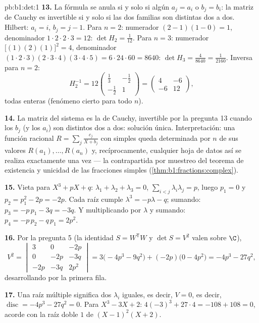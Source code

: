 \begin{solution}{pb:b1:det:1}
\textbf{13.} La fórmula se anula si y solo si algún $a_j = a_i$ o
$b_j = b_i$: la matriz de Cauchy es invertible si y solo si las dos
familias son distintas dos a dos. Hilbert: $a_i = i$, $b_j = j - 1$.
Para $n = 2$: numerador $(2-1)(1-0) = 1$, denominador
$1\cdot2\cdot2\cdot3 = 12$: $\det H_2 = \frac1{12}$. Para $n = 3$:
numerador $\bigl[(1)(2)(1)\bigr]^2 = 4$, denominador
$(1\cdot2\cdot3) (2\cdot3\cdot4)(3\cdot4\cdot5) = 6\cdot24\cdot60 =
8640$: $\det H_3 = \frac{4}{8640} = \frac1{2160}$. Inversa para
$n = 2$:
\[
H_2^{-1} = 12\begin{pmatrix} \frac13 & -\frac12\\[2pt]
-\frac12 & 1\end{pmatrix}
= \begin{pmatrix} 4 & -6\\ -6 & 12 \end{pmatrix},
\]
todas enteras (fenómeno cierto para todo $n$).

\textbf{14.} La matriz del sistema es la de Cauchy, invertible por la
pregunta 13 cuando los $b_j$ (y los $a_i$) son distintos dos a dos:
solución única. Interpretación: una función racional
$R = \sum_j \frac{c_j}{X + b_j}$ con  simples queda determinada
por $n$ de sus valores $R(a_1), \dots, R(a_n)$ y, recíprocamente,
cualquier hoja de datos así se realiza exactamente una vez --- la
contrapartida por muestreo del teorema de existencia y unicidad de
las fracciones simples (\cref{thm:b1:fractions:complex}).

\textbf{15.} Vieta para $X^3 + pX + q$:
$\lambda_1 + \lambda_2 + \lambda_3 = 0$,
$\sum_{i<j}\lambda_i\lambda_j = p$, luego $p_1 = 0$ y
$p_2 = p_1^2 - 2p = -2p$. Cada raíz cumple
$\lambda^3 = -p\lambda - q$; sumando: $p_3 = -p\,p_1 - 3q = -3q$. Y
multiplicando por $\lambda$ y sumando: $p_4 = -p\,p_2 - q\,p_1 = 2p^2$.

\textbf{16.} Por la pregunta 5 (la identidad $S = W^{\mathsf T}W$ y
$\det S = V^2$ valen sobre $\C$),
\[
V^2 = \begin{vmatrix}
3 & 0 & -2p\\
0 & -2p & -3q\\
-2p & -3q & 2p^2
\end{vmatrix}
= 3\bigl(-4p^3 - 9q^2\bigr) + (-2p)\bigl(0 - 4p^2\bigr)
= -4p^3 - 27q^2 ,
\]
desarrollando por la primera fila.

\textbf{17.} Una raíz múltiple significa dos $\lambda_i$ iguales, es
decir, $V = 0$, es decir,
$\operatorname{disc} = -4p^3 - 27q^2 = 0$. Para $X^3 - 3X + 2$:
$4(-3)^3 + 27\cdot4 = -108 + 108 = 0$, acorde con la raíz doble $1$
de $(X-1)^2(X+2)$.


\end{solution}
